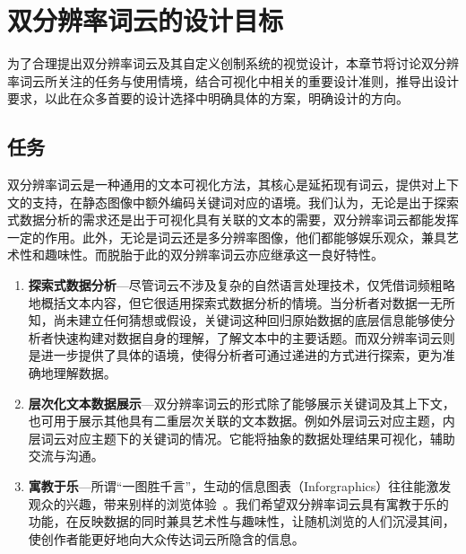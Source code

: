 \chapter{双分辨率词云的设计目标}

为了合理提出双分辨率词云及其自定义创制系统的视觉设计，本章节将讨论双分辨率词云所关注的任务与使用情境，结合可视化中相关的重要设计准则，推导出设计要求，以此在众多首要的设计选择中明确具体的方案，明确设计的方向。

\section{任务}
双分辨率词云是一种通用的文本可视化方法，其核心是延拓现有词云，提供对上下文的支持，在静态图像中额外编码关键词对应的语境。我们认为，无论是出于探索式数据分析的需求还是出于可视化具有关联的文本的需要，双分辨率词云都能发挥一定的作用。此外，无论是词云还是多分辨率图像，他们都能够娱乐观众，兼具艺术性和趣味性。而脱胎于此的双分辨率词云亦应继承这一良好特性。

\begin{enumerate}[leftmargin=*]
	\renewcommand{\labelenumi}{\textbf{T\theenumi.}}
	\renewcommand{\labelenumii}{\textbf{ T\theenumi.\arabic{enumii}}}

	\item \textbf{探索式数据分析}---尽管词云不涉及复杂的自然语言处理技术，仅凭借词频粗略地概括文本内容，但它很适用探索式数据分析的情境。当分析者对数据一无所知，尚未建立任何猜想或假设，关键词这种回归原始数据的底层信息能够使分析者快速构建对数据自身的理解，了解文本中的主要话题。而双分辨率词云则是进一步提供了具体的语境，使得分析者可通过递进的方式进行探索，更为准确地理解数据。

   \item \textbf{层次化文本数据展示}---双分辨率词云的形式除了能够展示关键词及其上下文，也可用于展示其他具有二重层次关联的文本数据。例如外层词云对应主题，内层词云对应主题下的关键词的情况。它能将抽象的数据处理结果可视化，辅助交流与沟通。

%
   \item \textbf{寓教于乐}---所谓“一图胜千言”，生动的信息图表（Inforgraphics）往往能激发观众的兴趣，带来别样的浏览体验~\supercite{Munzner2014}。我们希望双分辨率词云具有寓教于乐的功能，在反映数据的同时兼具艺术性与趣味性，让随机浏览的人们沉浸其间，使创作者能更好地向大众传达词云所隐含的信息。

\end{enumerate}


